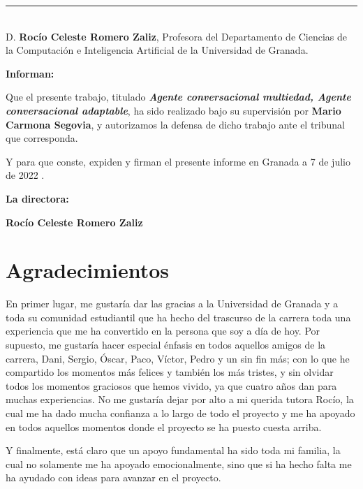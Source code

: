 \noindent\rule[-1ex]{\textwidth}{2pt}\\[4.5ex]

D. \textbf{Rocío Celeste Romero Zaliz}, Profesora del Departamento de Ciencias de la Computación e Inteligencia Artificial de la Universidad de Granada.

\vspace{0.5cm}

\textbf{Informan:}

\vspace{0.5cm}

Que el presente trabajo, titulado \textit{\textbf{Agente conversacional multiedad, Agente conversacional adaptable}},
ha sido realizado bajo su supervisión por \textbf{Mario Carmona Segovia}, y autorizamos la defensa de dicho trabajo ante el tribunal
que corresponda.

\vspace{0.5cm}

Y para que conste, expiden y firman el presente informe en Granada a 7 de julio de 2022 .

\vspace{1cm}

\textbf{La directora:}

\vspace{5cm}

\noindent \textbf{Rocío Celeste Romero Zaliz}

\chapter*{Agradecimientos}
\thispagestyle{empty}

       \vspace{1cm}


En primer lugar, me gustaría dar las gracias a la Universidad de Granada y a toda su comunidad estudiantil que ha hecho del trascurso de la carrera toda una experiencia que me ha convertido en la persona que soy a día de hoy. Por supuesto, me gustaría hacer especial énfasis en todos aquellos amigos de la carrera, Dani, Sergio, Óscar, Paco, Víctor, Pedro y un sin fin más; con lo que he compartido los momentos más felices y también los más tristes, y sin olvidar todos los momentos graciosos que hemos vivido, ya que cuatro años dan para muchas experiencias. No me gustaría dejar por alto a mi querida tutora Rocío, la cual me ha dado mucha confianza a lo largo de todo el proyecto y me ha apoyado en todos aquellos momentos donde el proyecto se ha puesto cuesta arriba.

Y finalmente, está claro que un apoyo fundamental ha sido toda mi familia, la cual no solamente me ha apoyado emocionalmente, sino que si ha hecho falta me ha ayudado con ideas para avanzar en el proyecto.
